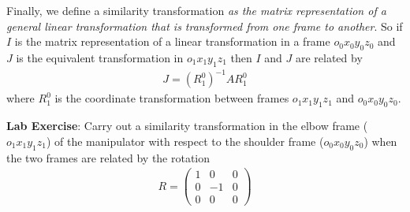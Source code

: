 Finally, we define a similarity transformation \textit{as the matrix representation of a general linear transformation that is transformed from one frame to another}. So if $I$ is the matrix representation of a linear transformation in a frame $o_0x_0y_0z_0$ and $J$ is the equivalent transformation in $o_1x_1y_1z_1$ then $I$ and $J$ are related by 
%
\begin{align}
J = (R_1^0)^{-1}AR_1^0
\end{align}
%
where $R_1^0$ is the coordinate transformation between frames $o_1x_1y_1z_1$ and $o_0x_0y_0z_0$.

\noindent \textbf{Lab Exercise}: Carry out a similarity transformation in the elbow frame ($o_1x_1y_1z_1$) of the manipulator with respect to the shoulder frame ($o_0x_0y_0z_0$) when the two frames are related by the rotation 
%
\begin{align}
R = 	\left(\begin{array}{ccc}
1 & 0 & 0 \\
%
0 & -1 & 0 \\
%
0 & 0 & 0
\end{array}\right)
\end{align}
%

